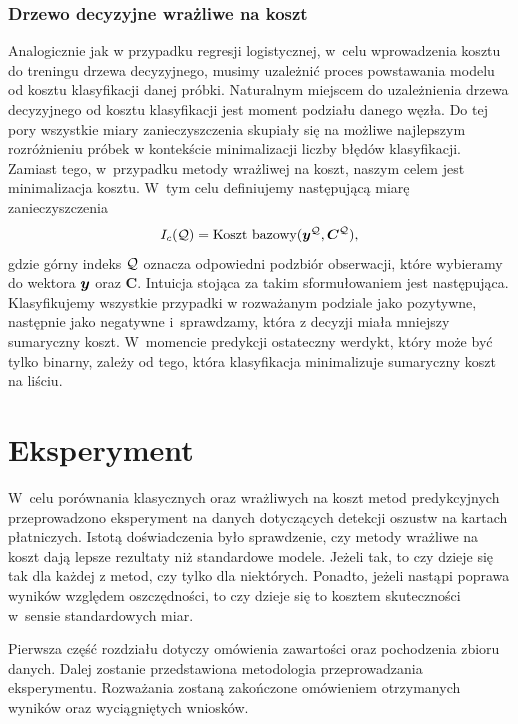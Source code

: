 \documentclass[inzynierska]{pwr_wmat_praca_dyplomowa}
\theoremstyle{plain}
\numberwithin{theorem}{chapter}
\theoremstyle{definition}
\numberwithin{theorem}{chapter}
\begin{document}
\subsection{Drzewo decyzyjne wrażliwe na koszt}
\label{csdt}
Analogicznie jak w przypadku regresji logistycznej, w~celu wprowadzenia kosztu do treningu drzewa decyzyjnego, musimy uzależnić proces powstawania modelu od kosztu klasyfikacji danej próbki. Naturalnym miejscem do uzależnienia drzewa decyzyjnego od kosztu klasyfikacji jest moment podziału danego węzła. Do tej pory wszystkie miary zanieczyszczenia skupiały się na możliwe najlepszym rozróżnieniu próbek w kontekście minimalizacji liczby błędów klasyfikacji. Zamiast tego, w~przypadku metody wrażliwej na koszt, naszym celem jest minimalizacja kosztu. W~tym celu definiujemy następującą miarę zanieczyszczenia
$$ I_c(\mathcal{Q}) = \text{Koszt bazowy}(\boldsymbol{y}^{\mathcal{Q}}, \boldsymbol{C}^{\mathcal{Q}}) \text{,}$$
gdzie górny indeks $\mathcal{Q}$ oznacza odpowiedni podzbiór obserwacji, które wybieramy do wektora $\boldsymbol{y}$ oraz $\boldsymbol{C}$. Intuicja stojąca za takim sformułowaniem jest następująca. Klasyfikujemy wszystkie przypadki w rozważanym podziale jako pozytywne, następnie jako negatywne i~sprawdzamy, która z decyzji miała mniejszy sumaryczny koszt. W~momencie predykcji ostateczny werdykt, który może być tylko binarny, zależy od tego, która klasyfikacja minimalizuje sumaryczny koszt na liściu.

\chapter{Eksperyment}
W~celu porównania klasycznych oraz wrażliwych na koszt metod predykcyjnych przeprowadzono eksperyment na danych dotyczących detekcji oszustw na kartach płatniczych. Istotą doświadczenia było sprawdzenie, czy metody wrażliwe na koszt dają lepsze rezultaty niż standardowe modele. Jeżeli tak, to czy dzieje się tak dla każdej z metod, czy tylko dla niektórych. Ponadto, jeżeli nastąpi poprawa wyników względem oszczędności, to czy dzieje się to kosztem skuteczności w~sensie standardowych miar. 

Pierwsza część rozdziału dotyczy omówienia zawartości oraz pochodzenia zbioru danych. Dalej zostanie przedstawiona metodologia przeprowadzania eksperymentu. Rozważania zostaną zakończone omówieniem otrzymanych wyników oraz wyciągniętych wniosków.
\end{document}
